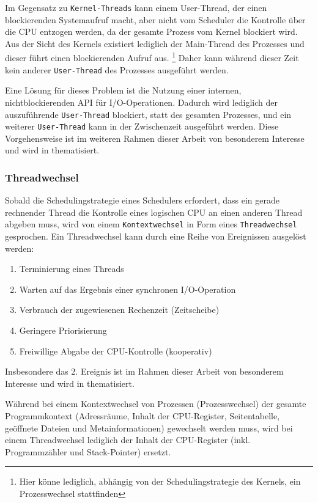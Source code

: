 Im Gegensatz zu \verb|Kernel-Threads| kann einem User-Thread, der einen blockierenden Systemaufruf macht, aber nicht vom Scheduler die Kontrolle über die CPU
entzogen werden, da der gesamte Prozess vom Kernel blockiert wird. Aus der Sicht des Kernels existiert lediglich der Main-Thread des Prozesses und dieser
führt einen blockierenden Aufruf aus. \footnote{Hier könne lediglich, abhängig von der Schedulingstrategie des Kernels, ein Prozesswechsel stattfinden}
Daher kann während dieser Zeit kein anderer \verb|User-Thread| des Prozesses ausgeführt werden.

Eine Lösung für dieses Problem ist die Nutzung einer internen, nichtblockierenden API für I/O-Operationen. Dadurch wird lediglich der
auszuführende \verb|User-Thread| blockiert, statt des gesamten Prozesses, und ein weiterer \verb|User-Thread| kann in der Zwischenzeit ausgeführt werden.
\parencite[Kapitel 2.2.4 Implementing Threads in User Space]{Tanenbaum2016}
Diese Vorgehensweise ist im weiteren Rahmen dieser Arbeit von besonderem Interesse und wird in \label{subsec:nonblocking-i/o} thematisiert.

\subsubsection{Threadwechsel}
\label{subsubsec:threadwechsel}
Sobald die Schedulingstrategie eines Schedulers erfordert, dass ein gerade rechnender Thread die Kontrolle eines logischen CPU an
einen anderen Thread abgeben muss, wird von einem \verb|Kontextwechsel| in Form eines \verb|Threadwechsel| gesprochen.
Ein Threadwechsel kann durch eine Reihe von Ereignissen ausgelöst werden:
\begin{enumerate}
    \item Terminierung eines Threads
    \item Warten auf das Ergebnis einer synchronen I/O-Operation
    \item Verbrauch der zugewiesenen Rechenzeit (Zeitscheibe)
    \item Geringere Priorisierung
    \item Freiwillige Abgabe der CPU-Kontrolle (kooperativ)
\end{enumerate}

Insbesondere das 2. Ereignis ist im Rahmen dieser Arbeit von besonderem Interesse und wird in \label{subsec:blocking-i/o} thematisiert.

Während bei einem Kontextwechsel von Prozessen (Prozesswechsel) der gesamte Programmkontext (Adressräume, Inhalt der CPU-Register,
Seitentabelle, geöffnete Dateien und Metainformationen)
gewechselt werden muss, wird bei einem Threadwechsel lediglich der Inhalt der CPU-Register (inkl. Programmzähler und Stack-Pointer)
ersetzt.\parencite{Mosberger2002}

